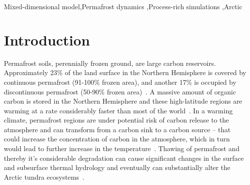 \documentclass[review]{elsarticle}
\begin{document}
\begin{frontmatter}
\begin{keyword}
Mixed-dimensional model\sep Permafrost dynamics  \sep Process-rich simulations \sep Arctic 
\end{keyword}
\end{frontmatter}

\linenumbers

\section{Introduction}

Permafrost soils, perennially frozen ground, are large carbon reservoirs. Approximately 23\% of the land surface in the Northern Hemisphere is covered by continuous permafrost (91-100\% frozen area), and another 17\% is occupied by discontinuous permafrost (50-90\% frozen area)~\cite{brown1997circum,jorgenson2001permafrost}. A massive amount of organic carbon is stored in the Northern Hemisphere and these high-latitude regions are warming at a rate considerably faster than most of the world~\cite{tarnocai2009soil, turner2007arctic, hansen1999giss, assessment2004impacts}. In a warming climate, permafrost regions are under potential risk of carbon release to the atmosphere and can transform from a carbon sink to a carbon source -- that could increase the concentration of carbon in the atmosphere, which in turn would lead to further increase in the temperature~\cite{billings1982arctic}. Thawing of permafrost and thereby it's considerable degradation can cause significant changes in the surface and subsurface thermal hydrology and eventually can substantially alter the Arctic tundra ecosystems~\cite{osterkamp1983response, walvoord2007increased, lyon2009estimation, pachauri2014climate,koven2013analysis}. 
\end{document}

